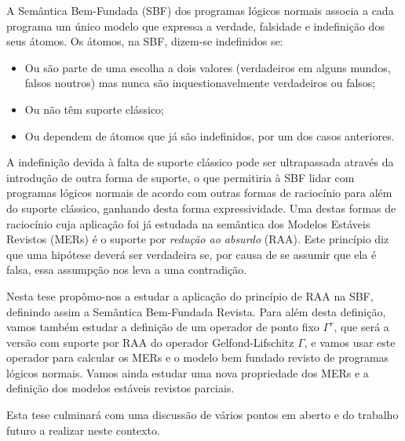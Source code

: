 A Semântica Bem-Fundada (SBF) dos programas lógicos normais associa a cada programa um único modelo que expressa a verdade, falsidade e indefinição dos seus átomos. Os átomos, na SBF, dizem-se indefinidos se:

\begin{itemize}
	\item Ou são parte de uma escolha a dois valores (verdadeiros em alguns mundos, falsos noutros) mas nunca são inquestionavelmente verdadeiros ou falsos;
	\item Ou não têm suporte clássico;
	\item Ou dependem de átomos que já são indefinidos, por um dos casos anteriores.
\end{itemize}

A indefinição devida à falta de suporte clássico pode ser ultrapassada através da introdução de outra forma de suporte, o que permitiria à SBF lidar com programas lógicos normais de acordo com outras formas de raciocínio para além do suporte clássico, ganhando desta forma expressividade. Uma destas formas de raciocínio cuja aplicação foi já estudada na semântica dos Modelos Estáveis Revistos (MERs) é o suporte por \emph{redução ao absurdo} (RAA). Este princípio diz que uma hipótese deverá ser verdadeira se, por causa de se assumir que ela é falsa, essa assumpção nos leva a uma contradição.

Nesta tese propômo-nos a estudar a aplicação do princípio de RAA na SBF, definindo assim a Semântica Bem-Fundada Revista. Para além desta definição, vamos também estudar a definição de um operador de ponto fixo $\Gamma^{r}$, que será a versão com suporte por RAA do operador Gelfond-Lifschitz $\Gamma$, e vamos usar este operador para calcular os MERs e o modelo bem fundado revisto de programas lógicos normais. Vamos ainda estudar uma nova propriedade dos MERs e a definição dos modelos estáveis revistos parciais.

Esta tese culminará com uma discussão de vários pontos em aberto e do trabalho futuro a realizar neste contexto.



\incrementmtc
